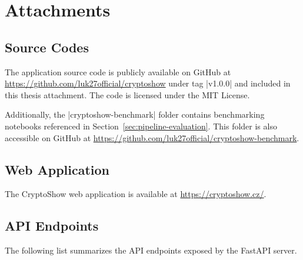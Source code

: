 \chapter{Attachments}

\section{Source Codes}
\label{sec:source-codes}

The application source code is publicly available on GitHub at \url{https://github.com/luk27official/cryptoshow} under tag \inline|v1.0.0| and included in this thesis attachment. The code is licensed under the MIT License.

Additionally, the \inline|cryptoshow-benchmark| folder contains benchmarking notebooks referenced in Section~\ref{sec:pipeline-evaluation}. This folder is also accessible on GitHub at \url{https://github.com/luk27official/cryptoshow-benchmark}.

\section{Web Application}
\label{sec:web-application}

The CryptoShow web application is available at \url{https://cryptoshow.cz/}.

\section{API Endpoints}
\label{sec:api-endpoints}

The following list summarizes the API endpoints exposed by the FastAPI server.

